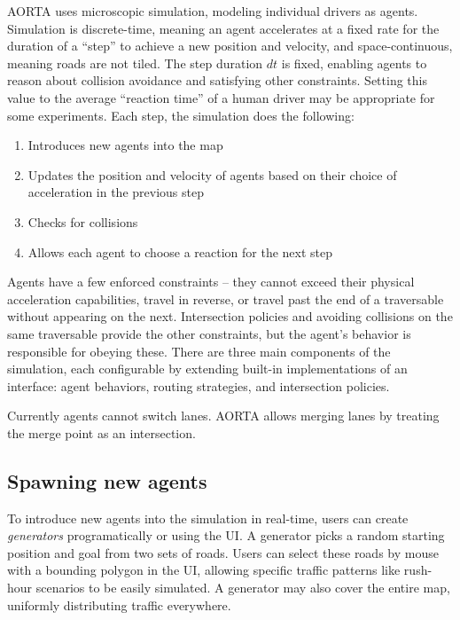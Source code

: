 \documentclass[letterpaper, 10 pt, conference]{ieeeconf}  %
\begin{document}
AORTA uses microscopic simulation, modeling individual drivers as agents.
Simulation is discrete-time, meaning an agent accelerates at a fixed rate for
the duration of a ``step'' to achieve a new position and velocity, and
space-continuous, meaning roads are not tiled. The step duration $dt$ is fixed,
enabling agents to reason about collision avoidance and satisfying other
constraints. Setting this value to the average ``reaction time'' of a human
driver may be appropriate for some experiments. Each step, the simulation
does the following:

\begin{enumerate}
  \item Introduces new agents into the map
  \item Updates the position and velocity of agents based on their choice of
  acceleration in the previous step
  \item Checks for collisions
  \item Allows each agent to choose a reaction for the next step
\end{enumerate}

Agents have a few enforced constraints -- they cannot exceed their physical
acceleration capabilities, travel in reverse, or travel past the end of a
traversable without appearing on the next. Intersection policies and avoiding
collisions on the same traversable provide the other constraints, but the
agent's behavior is responsible for obeying these. There are three main components of the
simulation, each configurable by extending built-in implementations of an
interface: agent behaviors, routing strategies, and intersection policies.

Currently agents cannot switch lanes. AORTA allows merging lanes by
treating the merge point as an intersection.

\subsection{Spawning new agents}

To introduce new agents into the simulation in real-time, users can create
\emph{generators} programatically or using the UI. A generator picks a random
starting position and goal from two sets of roads. Users can select these roads 
by mouse with a bounding polygon in the UI, allowing specific traffic patterns
like rush-hour scenarios to be easily simulated. A generator
may also cover the entire map, uniformly distributing traffic everywhere.
\end{document}
